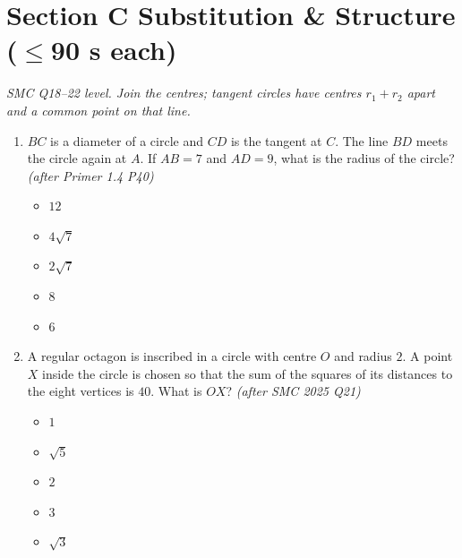 \documentclass[11pt,a4paper]{article}
\begin{document}
\section*{Section C \quad Substitution \& Structure \hfill{\normalfont\small($\leq$90 s each)}}

\noindent\textit{SMC Q18--22 level. Join the centres; tangent circles have centres $r_1+r_2$ apart and a common point on that line.}

\begin{enumerate}

\item \begin{minipage}[t]{0.60\linewidth}
$BC$ is a diameter of a circle and $CD$ is the tangent at $C$. The line $BD$ meets the circle again at $A$. If $AB=7$ and $AD=9$, what is the radius of the circle? \textit{\small(after Primer 1.4 P40)}
\begin{itemize}
\item[A)] $12$
\item[B)] $4\sqrt7$
\item[C)] $2\sqrt7$
\item[D)] $8$
\item[E)] $6$
\end{itemize}
\end{minipage}\hfill
\begin{minipage}[t]{0.36\linewidth}
\vspace{0pt}
\centering
{}
\end{minipage}

\item A regular octagon is inscribed in a circle with centre $O$ and radius $2$. A point $X$ inside the circle is chosen so that the sum of the squares of its distances to the eight vertices is $40$. What is $OX$? \textit{\small(after SMC 2025 Q21)}
\begin{itemize}
\item[A)] $1$
\item[B)] $\sqrt5$
\item[C)] $2$
\item[D)] $3$
\item[E)] $\sqrt3$
\end{itemize}


\end{enumerate}
\end{document}
